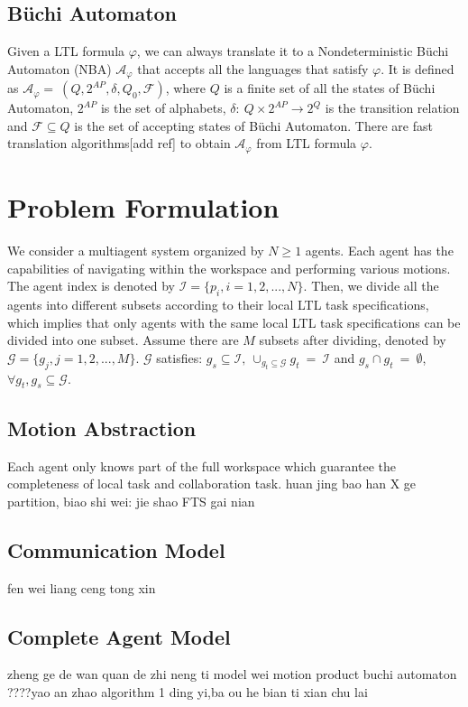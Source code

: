 \documentclass[journal]{IEEEtran}
\begin{document}
\subsection{B\"{u}chi Automaton}
Given a LTL formula $\varphi$, we can always translate it to a Nondeterministic B\"{u}chi Automaton (NBA) $\mathcal{A}_\varphi$ that accepts all the languages that satisfy $\varphi$. It is defined as $\mathcal{A}_\varphi=\ (Q,2^{AP},\delta,Q_0,\mathcal{F})$, where $Q$ is a finite set of all the states of B\"{u}chi Automaton, $2^{AP}$ is the set of alphabets, $\delta:\ Q\times 2^{AP}\rightarrow 2^Q$ is the transition relation and $\mathcal{F}\subseteq Q$ is the set of accepting states of B\"{u}chi Automaton. There are fast translation algorithms[add ref] to obtain $\mathcal{A}_\varphi$ from LTL formula $\varphi$.

\section{Problem Formulation}
We consider a multiagent system organized by $N\geq1$ agents. Each agent has the capabilities of navigating within the workspace and performing various motions. The agent index is denoted by $\mathcal{I}=\{p_i,i=1,2,...,N\}$. Then, we divide all the agents into different subsets according to their local LTL task specifications, which implies that only agents with the same local LTL task specifications can be divided into one subset. Assume there are $M$ subsets after dividing, denoted by $\mathcal{G}=\{g_j,j=1,2,...,M\}$. $\mathcal{G}$ satisfies: $g_s\subseteq \mathcal{I},\ \cup_{g_t\subseteq \mathcal{G}}g_t\ =\ \mathcal{I}$ and $g_s\cap g_t\ =\ \emptyset$, $\forall g_t,g_s \subseteq \mathcal{G}$.
\subsection{Motion Abstraction}
Each agent only knows part of the full workspace which guarantee the completeness of local task and collaboration task. huan jing bao han X ge partition, biao shi wei:   jie shao FTS gai nian
\subsection{Communication Model}
fen wei liang ceng tong xin
\subsection{Complete Agent Model}
zheng ge de wan quan de zhi neng ti model wei motion product buchi automaton
????yao an zhao algorithm 1 ding yi,ba ou he bian ti xian chu lai
\end{document}
